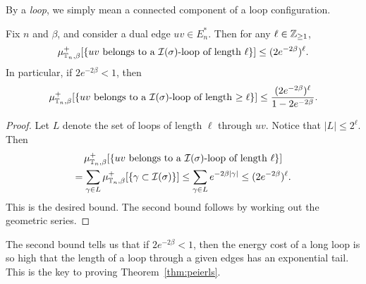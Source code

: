 By a \emph{loop}, we simply mean a connected component of a loop configuration.

\begin{lemma}
    Fix $n$ and $\beta$,
    and consider a dual edge $uv\in E_n^*$.
    Then for any $\ell\in\mathbb Z_{\geq 1}$,
    \[
        \mu_{\T_n,\beta}^+[\{\text{$uv$ belongs to a $\calI(\sigma)$-loop of length $\ell$}\}]
        \leq (2e^{-2\beta})^\ell.
    \]
    In particular, if $2e^{-2\beta}<1$, then
    \[
        \mu_{\T_n,\beta}^+[\{\text{$uv$ belongs to a $\calI(\sigma)$-loop of length $\geq\ell$}\}]
        \leq \frac{(2e^{-2\beta})^\ell}{1-2e^{-2\beta}}.
    \]
\end{lemma}

\begin{proof}
    Let $L$ denote the set of loops of length $\ell$ through $uv$.
    Notice that $|L|\leq 2^\ell$.
    Then
    \begin{multline}
        \mu_{\T_n,\beta}^+[\{\text{$uv$ belongs to a $\calI(\sigma)$-loop of length $\ell$}\}]
        \\=
        \sum_{\gamma\in L} \mu_{\T_n,\beta}^+[\{\gamma\subset\calI(\sigma)\}]
        \leq
        \sum_{\gamma\in L} e^{-2\beta|\gamma|}
        \leq
        (2e^{-2\beta})^\ell.
    \end{multline}
    This is the desired bound.
    The second bound follows by working out the geometric series.
\end{proof}

The second bound tells us that if $2e^{-2\beta}<1$,
then the energy cost of a long loop is so high that the length of a loop
through a given edges has an exponential tail.
This is the key to proving Theorem~\ref{thm:peierls}.

